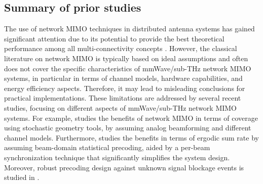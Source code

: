 \documentclass[10pt,journal,a4paper]{IEEEtran}
\begin{document}
\IEEEpubidadjcol
\subsection{Summary of prior studies}
The use of network MIMO techniques in distributed antenna systems has gained significant attention due to its potential to provide the best theoretical performance among all multi-connectivity concepts \cite{gesbert2010multicell}. However, the classical literature on network MIMO is typically based on ideal assumptions and often does not cover the specific characteristics of mmWave/sub-THz network MIMO systems, in particular in terms of channel models, hardware capabilities, and energy efficiency aspects. Therefore, it may lead to misleading conclusions for practical implementations. These limitations are addressed by several recent studies, focusing on different aspects of mmWave/sub-THz network MIMO systems. For example, \cite{tuninetti2016coverage} studies the benefits of network MIMO in terms of coverage using stochastic geometry tools, by assuming analog beamforming and different channel models. Furthermore, \cite{fettweis2020network} studies the benefits in terms of ergodic sum rate by assuming beam-domain statistical precoding, aided by a per-beam synchronization technique that significantly simplifies the system design. Moreover, robust precoding design against unknown signal blockage events is studied in \cite{tolli2021blockage}. 
\end{document}

